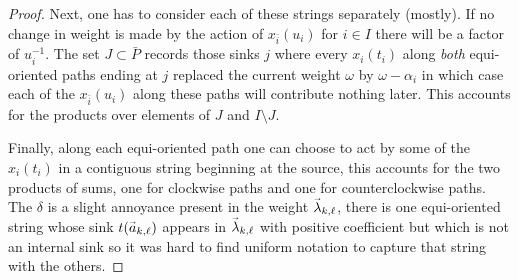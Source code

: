 \documentclass[11pt]{amsart}
\renewcommand{\vec}[1]{\accentset{\shortrightarrow}{#1}}
\numberwithin{equation}{section}
\begin{document}
{\begin{proof}
    Next, one has to consider each of these strings separately (mostly).  If no change in weight is made by the action of $x_{\bar{i}}(u_i)$ for $i\in I$ there will be a factor of $u_i^{-1}$.  The set $J\subset\bar{P}$ records those sinks $j$ where every $x_i(t_i)$ along \emph{both} equi-oriented paths ending at $j$ replaced the current weight $\omega$ by $\omega-\alpha_i$ in which case each of the $x_{\bar{i}}(u_i)$ along these paths will contribute nothing later.  This accounts for the products over elements of $J$ and $I\setminus J$.

    Finally, along each equi-oriented path one can choose to act by some of the $x_i(t_i)$ in a contiguous string beginning at the source, this accounts for the two products of sums, one for clockwise paths and one for counterclockwise paths.  The $\delta$ is a slight annoyance present in the weight $\vec{\lambda}_{k,\ell}$, there is one equi-oriented string whose sink $t(\vec{a}_{k,\ell})$ appears in $\vec{\lambda}_{k,\ell}$ with positive coefficient but which is not an internal sink so it was hard to find uniform notation to capture that string with the others.
  \end{proof}}%
\end{document}

